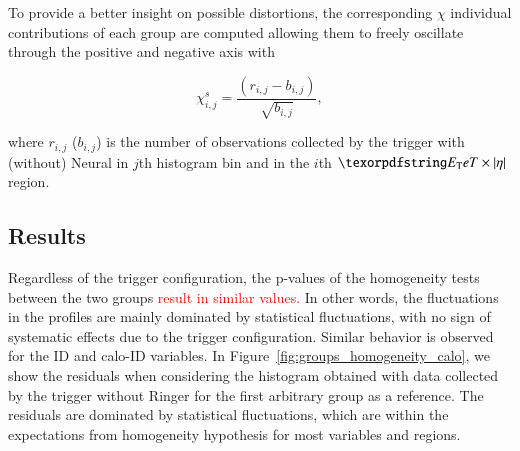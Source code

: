 To provide a better insight on possible distortions, the corresponding $\chi$
individual contributions of each group are computed allowing them to freely
oscillate through the positive and negative axis with

\begin{equation}
  \chi_{i,j}^{s} = \frac{(r_{i,j} - b_{i,j})}{\sqrt{b_{i,j}}},
  \label{eq:signed_chi}
\end{equation}

\noindent where $r_{i,j}$ ($b_{i,j}$) is the number of observations collected by
the trigger with (without) Neural\rnn{} in $j$th histogram bin and in the $i$th
$\et{}\times\abseta{}$ region.




\subsection{Results}\label{top:agreement_homogeneity_results}




Regardless of the trigger configuration, the p-values of the homogeneity tests between the two groups \textcolor{red}{result in similar values.} In other words, the fluctuations in the profiles are mainly dominated by statistical fluctuations, with no sign of systematic effects due to the trigger configuration. Similar behavior is observed for the ID and calo-ID variables. In Figure~\ref{fig:groups_homogeneity_calo}, we show the residuals when considering the histogram obtained with data collected by the trigger without Ringer for the first arbitrary group as a reference. The residuals are dominated by statistical fluctuations, which are within the expectations from homogeneity hypothesis for most variables and regions.



